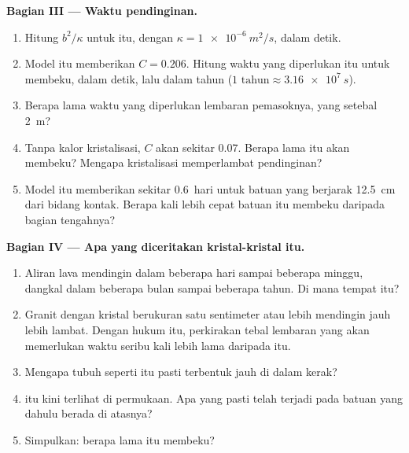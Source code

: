 \begin{problem}
\medskip
\noindent\textbf{Bagian III --- Waktu pendinginan.}
\begin{enumerate}[resume]
  \item Hitung $b^2/\kappa$ untuk  itu, dengan $\kappa = \qty{1e-6}{m^2/s}$,
        dalam detik.
  \item Model itu memberikan $C = 0.206$. Hitung waktu yang diperlukan  itu untuk membeku, dalam
        detik, lalu dalam tahun ($\num{1}\text{ tahun} \approx \qty{3.16e7}{s}$).
  \item Berapa lama waktu yang diperlukan lembaran pemasoknya, yang setebal
        \qty{2}{m}?
  \item Tanpa kalor kristalisasi, $C$ akan sekitar $0.07$.
        Berapa lama  itu akan membeku? Mengapa kristalisasi memperlambat
        pendinginan?
  \item Model itu memberikan sekitar \num{0.6}~hari untuk batuan yang berjarak
        \qty{12.5}{cm} dari bidang kontak. Berapa kali lebih cepat batuan itu
        membeku daripada bagian tengahnya?
\end{enumerate}

\medskip
\noindent\textbf{Bagian IV --- Apa yang diceritakan kristal-kristal itu.}
\begin{enumerate}[resume]
  \item Aliran lava mendingin dalam beberapa hari sampai beberapa minggu,
         dangkal dalam beberapa bulan sampai beberapa tahun. Di mana
        tempat  itu?
  \item Granit dengan kristal berukuran satu sentimeter atau lebih mendingin
        jauh lebih lambat. Dengan hukum itu, perkirakan tebal lembaran yang
        akan memerlukan waktu seribu kali lebih lama daripada  itu.
  \item Mengapa tubuh seperti itu pasti terbentuk jauh di dalam kerak?
  \item {} itu kini terlihat di permukaan. Apa yang pasti telah terjadi pada
        batuan yang dahulu berada di atasnya?
  \item Simpulkan: berapa lama  itu membeku?
\end{enumerate}
\end{problem}
